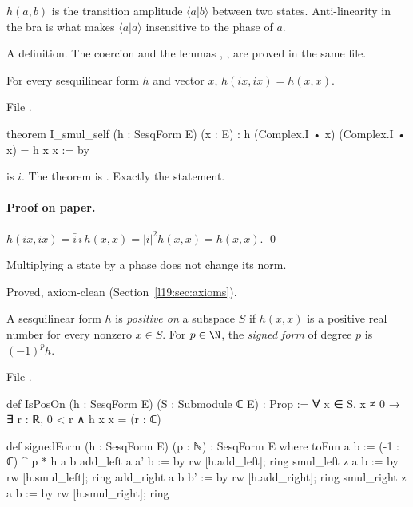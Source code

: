 \begin{physics}
$h(a,b)$ is the transition amplitude $\langle a|b\rangle$ between two states. Anti-linearity in the
bra is what makes $\langle a|a\rangle$ insensitive to the phase of $a$.
\end{physics}

\begin{status}
A definition. The coercion and the lemmas , ,
 are proved in the same file.
\end{status}

\begin{theorem}\label{l19:thm:ismul}
For every sesquilinear form $h$ and vector $x$, $h(ix,ix) = h(x,x)$.
\end{theorem}

\noindent File .
\begin{leancode}
theorem I_smul_self (h : SesqForm E) (x : E) :
    h (Complex.I • x) (Complex.I • x) = h x x := by
\end{leancode}

\begin{dictionary}
 is $i$. The theorem is . Exactly the statement.
\end{dictionary}

\paragraph{Proof on paper.} $h(ix,ix) = \bar i\,i\,h(x,x) = |i|^2h(x,x) = h(x,x)$. \qed

\begin{physics}
Multiplying a state by a phase does not change its norm.
\end{physics}

\begin{status}
Proved, axiom-clean (Section~\ref{l19:sec:axioms}).
\end{status}

\begin{definition}\label{l19:def:isposon}
A sesquilinear form $h$ is \emph{positive on} a subspace $S$ if $h(x,x)$ is a positive real number
for every nonzero $x\in S$. For $p\in\N$, the \emph{signed form} of degree $p$ is $(-1)^ph$.
\end{definition}

\noindent File .
\begin{leancode}
def IsPosOn (h : SesqForm E) (S : Submodule ℂ E) : Prop :=
  ∀ x ∈ S, x ≠ 0 → ∃ r : ℝ, 0 < r ∧ h x x = (r : ℂ)

def signedForm (h : SesqForm E) (p : ℕ) : SesqForm E where
  toFun a b := (-1 : ℂ) ^ p * h a b
  add_left a a' b := by rw [h.add_left]; ring
  smul_left z a b := by rw [h.smul_left]; ring
  add_right a b b' := by rw [h.add_right]; ring
  smul_right z a b := by rw [h.smul_right]; ring
\end{leancode}

